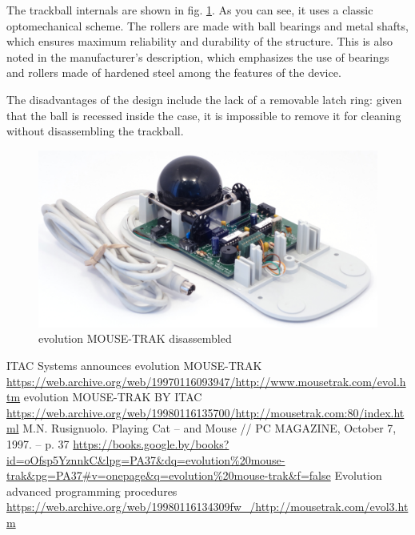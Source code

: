 \documentclass[11pt, a4paper]{article}
\begin{document}
The trackball internals are shown in fig. \ref{fig:evolutionMOUSE-TRAKInside}. As you can see, it uses a classic optomechanical scheme. The rollers are made with ball bearings and metal shafts, which ensures maximum reliability and durability of the structure. This is also noted in the manufacturer's description, which emphasizes the use of bearings and rollers made of hardened steel among the features of the device.

The disadvantages of the design include the lack of a removable latch ring: given that the ball is recessed inside the case, it is impossible to remove it for cleaning without disassembling the trackball.

\begin{figure}[h]
    \centering
    \includegraphics[scale=0.5]{1997_mousetrak_evolution/inside_30.jpg}
    \caption{evolution MOUSE-TRAK disassembled}
    \label{fig:evolutionMOUSE-TRAKInside}
\end{figure}

\begin{thebibliography}{9}
 ITAC Systems announces evolution MOUSE-TRAK \url{https://web.archive.org/web/19970116093947/http://www.mousetrak.com/evol.htm}
 evolution MOUSE-TRAK BY ITAC \url{https://web.archive.org/web/19980116135700/http://mousetrak.com:80/index.html}
 M.N. Rusignuolo. Playing Cat -- and Mouse // PC MAGAZINE, October 7, 1997. -- p. 37 \url{https://books.google.by/books?id=oOfsp5YznnkC&lpg=PA37&dq=evolution%20mouse-trak&pg=PA37#v=onepage&q=evolution%20mouse-trak&f=false}
 Evolution advanced programming procedures \url{https://web.archive.org/web/19980116134309fw_/http://mousetrak.com/evol3.htm}
\end{thebibliography}
\end{document}
